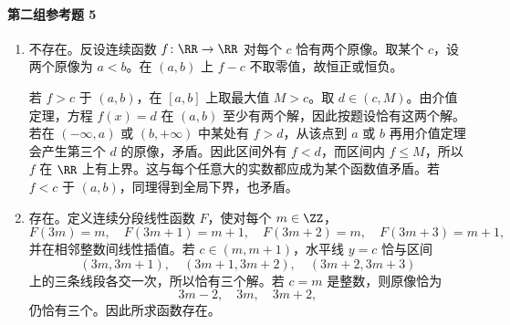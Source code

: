 \paragraph{第二组参考题 5}
\begin{xsolution}
\begin{enumerate}[label=(\arabic*)]
 \item 不存在。反设连续函数 $f\colon\RR\to\RR$ 对每个 $c$ 恰有两个原像。取某个 $c$，设两个原像为 $a<b$。在 $(a,b)$ 上 $f-c$ 不取零值，故恒正或恒负。

 若 $f>c$ 于 $(a,b)$，在 $[a,b]$ 上取最大值 $M>c$。取 $d\in(c,M)$。由介值定理，方程 $f(x)=d$ 在 $(a,b)$ 至少有两个解，因此按题设恰有这两个解。若在 $(-\infty,a)$ 或 $(b,+\infty)$ 中某处有 $f>d$，从该点到 $a$ 或 $b$ 再用介值定理会产生第三个 $d$ 的原像，矛盾。因此区间外有 $f<d$，而区间内 $f\le M$，所以 $f$ 在 $\RR$ 上有上界。这与每个任意大的实数都应成为某个函数值矛盾。若 $f<c$ 于 $(a,b)$，同理得到全局下界，也矛盾。

 \item 存在。定义连续分段线性函数 $F$，使对每个 $m\in\ZZ$，
 \[
  F(3m)=m,
  \quad F(3m+1)=m+1,
  \quad F(3m+2)=m,
  \quad F(3m+3)=m+1,
 \]
 并在相邻整数间线性插值。若 $c\in(m,m+1)$，水平线 $y=c$ 恰与区间
 \[
  (3m,3m+1),\quad(3m+1,3m+2),\quad(3m+2,3m+3)
 \]
 上的三条线段各交一次，所以恰有三个解。若 $c=m$ 是整数，则原像恰为
 \[
  3m-2,\quad3m,\quad3m+2,
 \]
 仍恰有三个。因此所求函数存在。
\end{enumerate}
\end{xsolution}

